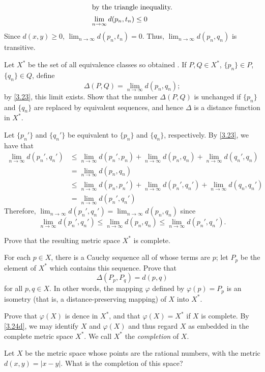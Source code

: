 \begin{exercise}
\begin{exercise}[label = (\alph*), ref = \arabic{exercisei} (\alph*)]
\begin{align*}
      \intertext{by the triangle inequality.}
      \lim_{n\to\infty}d(p_n, t_n) & \leq 0
    \end{align*}
    Since \(d(x,y)\geq 0\), \(\lim_{n\to\infty}d(p_n, t_n) = 0\).
    Thus, \(\lim_{n\to\infty}d(p_n,q_n)\) is transitive.
  \item
    Let \(X^*\) be the set of all equivalence classes so obtained .
    If \(P,Q\in X^*\), \(\{p_n\}\in P\), \(\{q_n\}\in Q\), define
    \[
    \Delta(P,Q) = \lim_{n\to\infty} d(p_n, q_n);
    \]
    by \cref{3.23}, this limit exists.
    Show that the number \(\Delta(P,Q)\) is unchanged if \(\{p_n\}\) and
    \(\{q_n\}\) are replaced by equivalent sequences, and hence \(\Delta\)
    is a distance function in \(X^*\).
    \par\smallskip
    Let \(\{p_n'\}\) and \(\{q_n'\}\) be equivalent to \(\{p_n\}\) and
    \(\{q_n\}\), respectively.
    By \cref{3.23}, we have that
    \begin{align*}
      \lim_{n\to\infty}d(p_n', q_n')
      & \leq \lim_{n\to\infty}d(p_n', p_n) + \lim_{n\to\infty}d(p_n, q_n) +
        \lim_{n\to\infty}d(q_n', q_n)\\
      & = \lim_{n\to\infty}d(p_n, q_n)\\
      & \leq \lim_{n\to\infty}d(p_n, p_n') + \lim_{n\to\infty}d(p_n', q_n') +
        \lim_{n\to\infty}d(q_n, q_n')\\
      & = \lim_{n\to\infty}d(p_n', q_n')
    \end{align*}
    Therefore, \(\lim_{n\to\infty}d(p_n',q_n') = \lim_{n\to\infty}d(p_n,q_n)\)
    since
    \[
    \lim_{n\to\infty}d(p_n', q_n')\leq\lim_{n\to\infty}d(p_n, q_n)\leq
    \lim_{n\to\infty}d(p_n', q_n').
    \]
  \item
    Prove that the resulting metric space \(X^*\) is complete.
  \item
    \label{3.24d}
    For each \(p\in X\), there is a Cauchy sequence all of whose terms are
    \(p\); let \(P_p\) be the element of \(X^*\) which contains this sequence.
    Prove that
    \[
    \Delta(P_p, P_q) = d(p, q)
    \]
    for all \(p,q\in X\).
    In other words, the mapping \(\varphi\) defined by \(\varphi(p) = P_p\) is
    an isometry (that is, a distance-preserving mapping) of \(X\) into \(X^*\).
  \item
    Prove that \(\varphi(X)\) is dence in \(X^*\), and that
    \(\varphi(X) = X^*\) if \(X\) is complete.
    By \cref{3.24d}, we may identify \(X\) and \(\varphi(X)\) and thus regard
    \(X\) as embedded in the complete metric space \(X^*\).
    We call \(X^*\) the \textit{completion} of \(X\).
  \end{exercise}
\item
  Let \(X\) be the metric space whose points are the rational numbers, with the
  metric \(d(x,y) = \lvert x - y\rvert\).
  What is the completion of this space?
\end{exercise}
